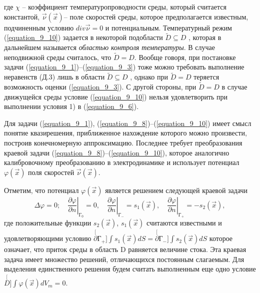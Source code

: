 где  $\chi$ -- коэффициент температуропроводности среды, который считается константой, $\vec\nu(\vec x)$-- поле скоростей среды, которое предполагается известным, подчиненным условию $div \vec\nu{=}0$ и потенциальным. Температурный режим (\ref{equation_9_10}) задается в некоторой подобласти $\tilde{D}{\subseteq}D$ , которая в дальнейшем называется \textit{ областью контроля температуры}. В случае неподвижной среды считалось, что $\tilde{D}{=}D$. Вообще говоря, при постановке задачи (\ref{equation_9_1})--(\ref{equation_9_3}) тоже можно требовать выполнение неравенств (Д.3) лишь в области $\tilde{D}{\subseteq}D$  , однако при $\tilde{D}{=}D$  теряется возможность оценки (\ref{equation_9_3}). С другой стороны, при $\tilde{D}{=}D$  в случае движущейся среды условие (\ref{equation_9_10}) нельзя удовлетворить при выполнении условия 1) в (\ref{equation_9_6}).

Для задачи (\ref{equation_9_1}), (\ref{equation_9_8})--(\ref{equation_9_10}) имеет смысл понятие квазирешения, приближенное нахождение которого можно произвести, построив конечномерную аппроксимацию. Последнее требует преобразования краевой задачи (\ref{equation_9_8})--(\ref{equation_9_10}), которое аналогично калибровочному преобразованию в электродинамике и использует потенциал $\varphi(\vec x)$ поля скоростей $\vec\nu(\vec x)$.

Отметим, что потенциал $\varphi(\vec x)$ является решением следующей краевой задачи \[\Delta\varphi=0;\quad \left.\frac{\partial \varphi}{\partial n}\right|_{Г_0}=0,\quad \left.\frac{\partial \varphi}{\partial n}\right|_{Г_-}=s_1(\vec x),\quad \left.\frac{\partial \varphi}{\partial n}\right|_{Г_+}=-s_2(\vec x),\]где положительные функции $s_2(\vec x)$, $s_1(\vec x)$  считаются известными и удовлетворяющими условию ${\stackrel[\partial Г_+]{}{\int}}s_1(\vec x)dS{=}{\stackrel[\partial Г_-]{}{\int}}s_2(\vec x)dS$ которое означает, что приток среды в область D равняется величине стока. Эта краевая задача имеет множество решений, отличающихся постоянным слагаемым. Для выделения единственного решения будем считать выполненным еще одно условие ${\stackrel[D]{}{\int}}\varphi(\vec x)dV_m=0$.

